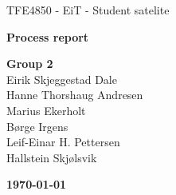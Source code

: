 \begin{titlepage}
\begin{center}

\vspace*{6cm}
{\Huge TFE4850 - EiT - Student satelite}

\vspace*{0.5cm}
{\LARGE\textbf{Process report}}

\vspace*{0.7cm}
{\Large
	\textbf{Group 2}\\
	Eirik Skjeggestad Dale\\
	Hanne Thorshaug Andresen\\
	Marius Ekerholt\\
	Børge Irgens\\
	Leif-Einar H. Pettersen\\
	Hallstein Skjølsvik
}

{\vfill\textbf{\today}}

\end{center}
\end{titlepage}